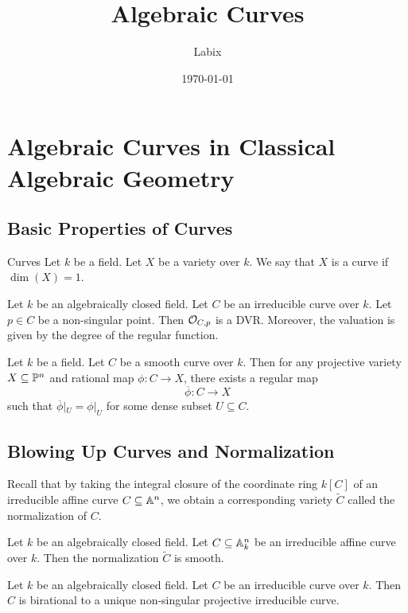 \documentclass[a4paper]{article}
\title{Algebraic Curves}
\author{Labix}
\date{\today}
\begin{document}
\maketitle
\begin{abstract}
\end{abstract}
\pagebreak
\tableofcontents
\pagebreak

\section{Algebraic Curves in Classical Algebraic Geometry}
\subsection{Basic Properties of Curves}
\begin{defn}{Curves}{} Let $k$ be a field. Let $X$ be a variety over $k$. We say that $X$ is a curve if $\dim(X)=1$. 
\end{defn}

\begin{prp}{}{} Let $k$ be an algebraically closed field. Let $C$ be an irreducible curve over $k$. Let $p\in C$ be a non-singular point. Then $\mathcal{O}_{C,p}$ is a DVR. Moreover, the valuation is given by the degree of the regular function. 
\end{prp}

\begin{prp}{}{} Let $k$ be a field. Let $C$ be a smooth curve over $k$. Then for any projective variety $X\subseteq\mathbb{P}^n$ and rational map $\phi:C\to X$, there exists a regular map $$\overline{\phi}:C\to X$$ such that $\overline{\phi}|_U=\phi|_U$ for some dense subset $U\subseteq C$. 
\end{prp}

\subsection{Blowing Up Curves and Normalization}
Recall that by taking the integral closure of the coordinate ring $k[C]$ of an irreducible affine curve $C\subseteq\mathbb{A}^n$, we obtain a corresponding variety $\widetilde{C}$ called the normalization of $C$. 

\begin{prp}{}{} Let $k$ be an algebraically closed field. Let $C\subseteq\mathbb{A}_k^n$ be an irreducible affine curve over $k$. Then the normalization $\widetilde{C}$ is smooth. 
\end{prp}

\begin{thm}{}{} Let $k$ be an algebraically closed field. Let $C$ be an irreducible curve over $k$. Then $C$ is birational to a unique non-singular projective irreducible curve. 
\end{thm}
\end{document}
